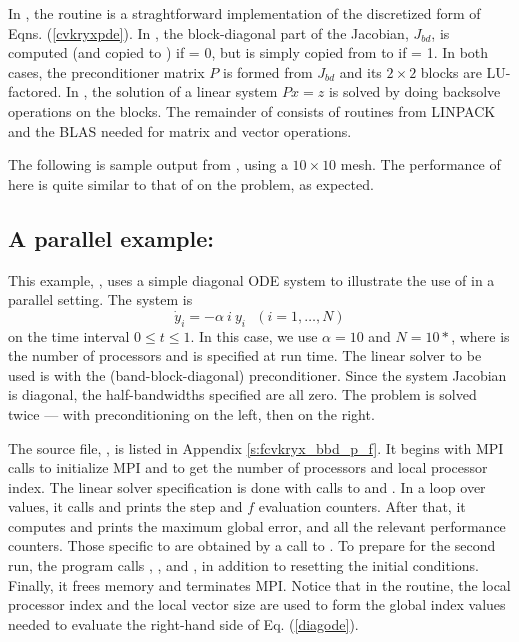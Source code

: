 In , the  routine is a straghtforward implementation
of the discretized form of Eqns. (\ref{cvkryxpde}).  In , the
block-diagonal part of the Jacobian, $J_{bd}$, is computed (and copied to
) if  = 0, but is simply copied from  to  if
 = 1.  In both cases, the preconditioner matrix $P$ is formed from 
$J_{bd}$ and its $2 \times 2$ blocks are LU-factored.  In ,
the solution of a linear system $Px = z$ is solved by doing backsolve
operations on the blocks.  The remainder of  consists of
routines from LINPACK and the BLAS needed for matrix and vector operations.

The following is sample output from , using a $10 \times 10$ mesh.
The performance of {\fcvode} here is quite similar to that of {\cvode} on
the  problem, as expected.



\subsection{A parallel example: }\label{ss:fcvkryx_bbd_p}

This example, , uses a simple diagonal ODE system to illustrate
the use of {\fcvode} in a parallel setting.  The system is
\begin{equation} \label{diagode}
\dot{y}_i = - \alpha ~i~ y_i ~~~ (i = 1,\ldots, N)
\end{equation}
on the time interval $0 \leq t \leq 1$.  In this case, we use $\alpha = 10$
and $N = 10*$, where  is the number of processors
and is specified at run time.  The linear solver to be used is
{\spgmr} with the {\cvbbdpre} (band-block-diagonal) preconditioner.
Since the system Jacobian is diagonal, the half-bandwidths specified
are all zero.  The problem is solved twice --- with preconditioning on
the left, then on the right.

The source file, , is listed in Appendix \ref{s:fcvkryx_bbd_p_f}.
It begins with MPI calls to initialize MPI and to get the number of processors
and local processor index.  The linear solver specification is done with
calls to  and .  In a loop over 
values, it calls  and prints the step and $f$ evaluation counters.
After that, it computes and prints the maximum global error, and all the
relevant performance counters.  Those specific to {\cvbbdpre} are obtained
by a call to .  To prepare for the second run, the program
calls , , and , in addition
to resetting the initial conditions.  Finally, it frees memory and terminates MPI.
Notice that in the  routine, the local processor index 
and the local vector size  are used to form the global index
values needed to evaluate the right-hand side of Eq. (\ref{diagode}).

